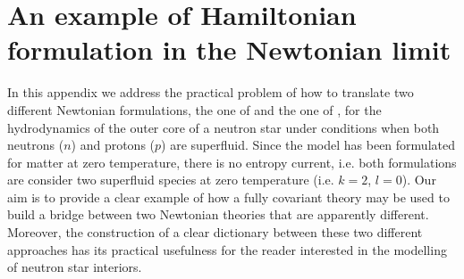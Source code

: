 \documentclass[usenatbib]{mnras}
\begin{document}
\section{An example of Hamiltonian formulation in the Newtonian limit}
\label{kasumotomorizuma}

In this appendix we address the practical problem of how to translate two different Newtonian formulations, the one of \cite{pca2002} and the one of \cite{KP2017}, for the hydrodynamics of the outer core of a neutron star under conditions when both neutrons ($n$) and protons ($p$) are superfluid. Since the model has been formulated for matter at zero temperature, there is no entropy current, i.e. both formulations are consider two superfluid species at zero temperature  (i.e. $k=2$, $l=0$).
Our aim is to provide a clear example of how a fully covariant theory may be used to build a bridge between two Newtonian theories that are apparently different. Moreover, the construction of a clear dictionary between these two different approaches has its practical usefulness for the reader interested in the modelling of neutron star interiors.
%
%
\end{document}
